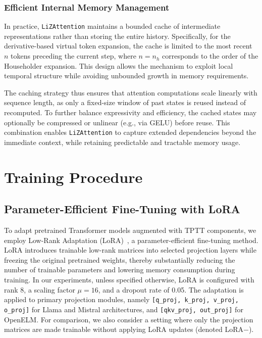 \documentclass[10pt,a4paper]{article}
\begin{document}
\subsubsection{Efficient Internal Memory Management}

In practice, \texttt{LiZAttention} maintains a bounded cache of intermediate representations rather than storing the entire history. Specifically, for the derivative-based virtual token expansion, the cache is limited to the most recent $n$ tokens preceding the current step, where $n = n_h$ corresponds to the order of the Householder expansion. This design allows the mechanism to exploit local temporal structure while avoiding unbounded growth in memory requirements. 

The caching strategy thus ensures that attention computations scale linearly with sequence length, as only a fixed-size window of past states is reused instead of recomputed. To further balance expressivity and efficiency, the cached states may optionally be compressed or unlinear (e.g., via GELU) before reuse. This combination enables \texttt{LiZAttention} to capture extended dependencies beyond the immediate context, while retaining predictable and tractable memory usage.



\section{Training Procedure}\label{sec:training}

\subsection{Parameter-Efficient Fine-Tuning with LoRA}

To adapt pretrained Transformer models augmented with TPTT components, we employ Low-Rank Adaptation (LoRA)~\cite{hu2022lora, lora_hf}, a parameter-efficient fine-tuning method. LoRA introduces trainable low-rank matrices into selected projection layers while freezing the original pretrained weights, thereby substantially reducing the number of trainable parameters and lowering memory consumption during training. In our experiments, unless specified otherwise, LoRA is configured with rank 8, a scaling factor \(\mu=16\), and a dropout rate of 0.05. The adaptation is applied to primary projection modules, namely \texttt{[q\_proj, k\_proj, v\_proj, o\_proj]} for Llama and Mistral architectures, and \texttt{[qkv\_proj, out\_proj]} for OpenELM. For comparison, we also consider a setting where only the projection matrices are made trainable without applying LoRA updates (denoted LoRA\(-\)).
\end{document}

